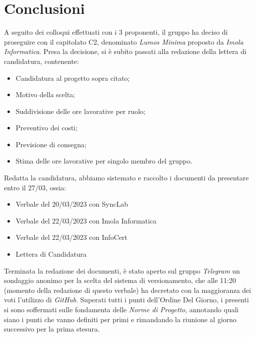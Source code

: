 \documentclass[a4paper, 12pt]{article}
\begin{document}
\section*{Conclusioni}
    A seguito dei colloqui effettuati con i 3 proponenti, il gruppo ha deciso di proseguire con il capitolato C2, denominato \textit{Lumos Minima} proposto da \textit{Imola Informatica}. Presa la decisione, si è subito passati alla redazione della lettera di candidatura, contenente:
    \begin{itemize}
        \item Candidatura al progetto sopra citato;
        \item Motivo della scelta;
        \item Suddivisione delle ore lavorative per ruolo;
        \item Preventivo dei costi;
        \item Previsione di consegna;
        \item Stima delle ore lavorative per singolo membro del gruppo.
    \end{itemize}
    Redatta la candidatura, abbiamo sistemato e raccolto i documenti da presentare entro il 27/03, ossia:
    \begin{itemize}
        \item Verbale del 20/03/2023 con SyncLab
        \item Verbale del 22/03/2023 con Imola Informatica
        \item Verbale del 22/03/2023 con InfoCert
        \item Lettera di Candidatura
    \end{itemize}
    Terminata la redazione dei documenti, è stato aperto sul gruppo \textit{Telegram} un sondaggio anonimo per la scelta del sistema di versionamento, che alle 11:20 (momento della redazione di questo verbale) ha decretato con la maggioranza dei voti l'utilizzo di \textit{GitHub}.
    Superati tutti i punti dell'Ordine Del Giorno, i presenti si sono soffermati sulle fondamenta delle \textit{Norme di Progetto}, annotando quali siano i punti che vanno definiti per primi e rimandando la riunione al giorno successivo per la prima stesura.
\end{document}
